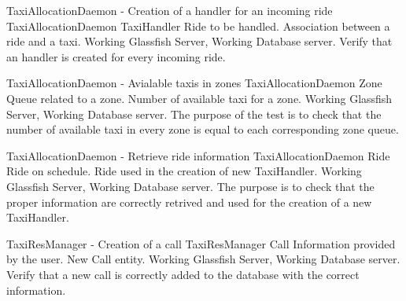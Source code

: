 \testx
{TaxiAllocationDaemon - Creation of a handler for an incoming ride}
{TaxiAllocationDaemon}
{TaxiHandler}
{Ride to be handled.}
{Association between a ride and a taxi.}
{Working Glassfish Server, Working Database server.}
{Verify that an handler is created for every incoming ride.}

\testx
{TaxiAllocationDaemon - Avialable taxis in zones}
{TaxiAllocationDaemon}
{Zone}
{Queue related to a zone.}
{Number of available taxi for a zone.}
{Working Glassfish Server, Working Database server.}
{The purpose of the test is to check that the number of available taxi in every
zone is equal to each corresponding zone queue.}

\testx
{TaxiAllocationDaemon - Retrieve ride information}
{TaxiAllocationDaemon}
{Ride}
{Ride on schedule.}
{Ride used in the creation of  new TaxiHandler.}
{Working Glassfish Server, Working Database server.}
{The purpose is to check that the proper information are correctly retrived and
used for the creation of a new TaxiHandler.}

\testx
{TaxiResManager - Creation of a call}
{TaxiResManager}
{Call}
{Information provided by the user.}
{New Call entity.}
{Working Glassfish Server, Working Database server.}
{Verify that a new call is correctly added to the database with the correct information.}
